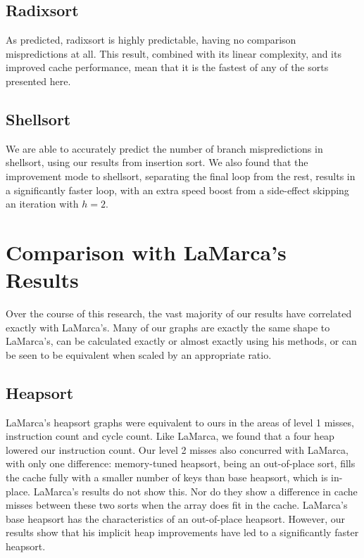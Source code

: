 \subsection{Radixsort}

As predicted, radixsort is highly predictable, having no comparison
mispredictions at all. This result, combined with its linear complexity, and its
improved cache performance, mean that it is the fastest of any of the sorts
presented here.


\subsection{Shellsort}

We are able to accurately predict the number of branch mispredictions in
shellsort, using our results from insertion sort. We also found that the
improvement mode to shellsort, separating the final loop from the rest, results
in a significantly faster loop, with an extra speed boost from a side-effect
skipping an iteration with $h = 2$.


\section{Comparison with LaMarca's Results}


Over the course of this research, the vast majority of our results have
correlated exactly with LaMarca's. Many of our graphs are exactly the same
shape to LaMarca's, can be calculated exactly or almost exactly using his
methods, or can be seen to be equivalent when scaled by an appropriate ratio.


\subsection{Heapsort}

LaMarca's heapsort graphs were equivalent to ours in the areas of level 1
misses, instruction count and cycle count. Like LaMarca, we found that a four
heap lowered our instruction count. Our level 2 misses also concurred with
LaMarca, with only one difference: memory-tuned heapsort, being an out-of-place sort,
fills the cache fully with a smaller number of keys than base heapsort, which is
in-place. LaMarca's results do not show this. Nor do they show a difference in
cache misses between these two sorts when the array does fit in the cache.
LaMarca's base heapsort has the characteristics of an out-of-place heapsort.
However, our results show that his implicit heap improvements have led to a
significantly faster heapsort.


